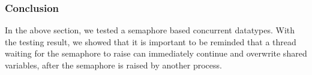 \documentclass{article}
\begin{document}
\subsubsection{Conclusion}
In the above section, we tested a semaphore based concurrent datatypes. With the testing result, we showed that it is important to be reminded that a thread waiting for the semaphore to raise can immediately continue and overwrite shared variables, after the semaphore is raised by another process.
\end{document}
